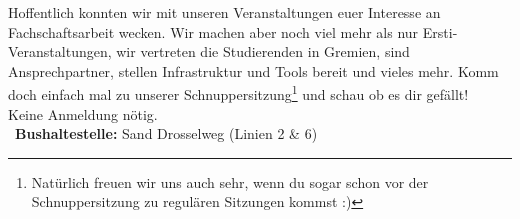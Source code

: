 \begin{description}
        Hoffentlich konnten wir mit unseren Veranstaltungen euer Interesse an Fachschaftsarbeit wecken.
        Wir machen aber noch viel mehr als nur Ersti-Veranstaltungen, wir vertreten die Studierenden in Gremien,
        sind Ansprechpartner, stellen Infrastruktur und Tools bereit und vieles mehr.
        Komm doch einfach mal zu unserer Schnuppersitzung\footnote{Natürlich freuen wir uns auch sehr, wenn du sogar schon vor der Schnuppersitzung zu regulären Sitzungen kommst :)}
        und schau ob es dir gefällt!\\
        Keine Anmeldung nötig.\\
        ~\textbf{Bushaltestelle:} Sand Drosselweg (Linien 2 \& 6)
    \fi
\fi










\end{description}

